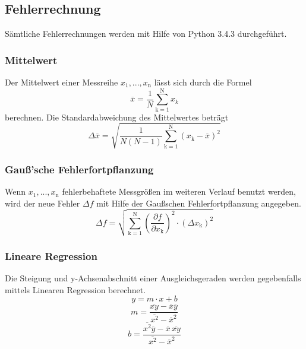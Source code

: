 \subsection{Fehlerrechnung}
Sämtliche Fehlerrechnungen werden mit Hilfe von Python 3.4.3 durchgeführt.
\subsubsection{Mittelwert}
Der Mittelwert einer Messreihe $x_\text{1}, ... ,x_\text{n}$ lässt sich durch die Formel
\begin{equation}
	\overline{x} = \frac{1}{N} \sum_{\text{k}=1}^\text{N} x_k
	\label{eqn:ave}
\end{equation}
berechnen. Die Standardabweichung des Mittelwertes beträgt
\begin{equation}
	\Delta \overline{x} = \sqrt{ \frac{1}{N(N-1)} \sum_{\text{k}=1}^\text{N} (x_\text{k} - \overline{x})^2}
	\label{eqn:std}
\end{equation}

\subsubsection{Gauß'sche Fehlerfortpflanzung}
Wenn $x_\text{1}, ..., x_\text{n}$ fehlerbehaftete Messgrößen im weiteren Verlauf benutzt werden, wird der neue Fehler $\Delta f$ mit Hilfe der Gaußschen Fehlerfortpflanzung angegeben.
\begin{equation}
	\Delta f = \sqrt{\sum_{\text{k}=1}^\text{N} \left( \frac{ \partial f}{\partial x_\text{k}} \right) ^2 \cdot (\Delta x_\text{k})^2}
	\label{eqn:var}
\end{equation}

\subsubsection{Lineare Regression}
Die Steigung und y-Achsenabschnitt einer Ausgleichsgeraden werden gegebenfalls mittels Linearen Regression berechnet.
\begin{equation}
	y = m \cdot x + b
	\label{eqn:reg}
\end{equation}
\begin{equation}
	m = \frac{ \overline{xy} - \overline{x} \overline{y} } {\overline{x^2} - \overline{x}^2}
	\label{eqn:reg_m}
\end{equation}
\begin{equation}
	b = \frac{ \overline{x^2}\overline{y} - \overline{x} \, \overline{xy}} { \overline{x^2} - \overline{x}^2}
	\label{eqn:reg_b}
\end{equation}
